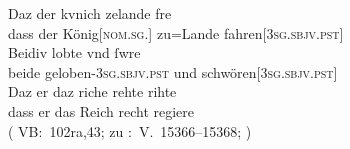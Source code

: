 \begin{exe}
\ex \label{ex:konjadjvvbeidiu}
	\begin{xlist}

	\ex \label{ex:konjadjvvbeidiu_2} %
		\gll Daz der kvnich zelande fre \\
			dass der König[\textsc{nom.sg.\MascM}] zu=Lande
			fahren[\textsc{3sg\subM.sbjv.pst}] \\
	\sn \gll Beidiv lobte vnd ſwre \\
			beide geloben-\textsc{3sg\subM.sbjv.pst} und
			schwören[\textsc{3sg\subM.sbjv.pst}] \\
	\sn \gll Daz er daz riche rehte rihte \\
			dass er das Reich recht regiere \\
		\trans {}
			(%
				VB:~102ra,43; zu
				\KC:~V.~15366--15368;
				\cite[359]{schroeder1895}%
			)



\end{xlist}
\end{exe}
